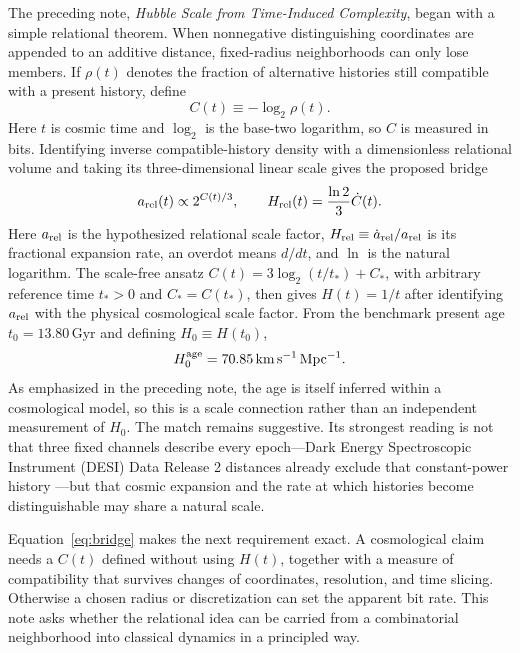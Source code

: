 \documentclass[10pt]{article}
\begin{document}
The preceding note, \emph{Hubble Scale from Time-Induced Complexity}, began
with a simple relational theorem.  When nonnegative distinguishing
coordinates are appended to an additive distance, fixed-radius neighborhoods
can only lose members.  If $\rho(t)$ denotes the fraction of alternative
histories still compatible with a present history, define
\begin{equation}
C(t)\equiv-\log_2\rho(t).
\label{eq:complexity}
\end{equation}
Here $t$ is cosmic time and $\log_2$ is the base-two logarithm, so $C$ is
measured in bits.  Identifying inverse compatible-history density with a
dimensionless relational volume and taking its three-dimensional linear scale
gives the proposed bridge
\begin{equation}
a_{\rm rel}(t)\propto2^{C(t)/3},
\qquad
H_{\rm rel}(t)=\frac{\ln2}{3}\dot C(t).
\label{eq:bridge}
\end{equation}
Here $a_{\rm rel}$ is the hypothesized relational scale factor,
$H_{\rm rel}\equiv\dot a_{\rm rel}/a_{\rm rel}$ is its fractional expansion
rate, an overdot means $d/dt$, and $\ln$ is the natural logarithm.  The
scale-free ansatz $C(t)=3\log_2(t/t_*)+C_*$, with arbitrary reference time
$t_*>0$ and $C_*=C(t_*)$, then gives $H(t)=1/t$ after identifying
$a_{\rm rel}$ with the physical cosmological scale factor.  From the benchmark
present age $t_0=13.80\,\mathrm{Gyr}$ and defining $H_0\equiv H(t_0)$,
\begin{equation}
H_0^{\rm age}=70.85\,\mathrm{km\,s^{-1}\,Mpc^{-1}}.
\label{eq:hubble-scale}
\end{equation}
As emphasized in the preceding note, the age is itself inferred within a
cosmological model, so this is a scale connection rather than an independent
measurement of $H_0$.  The match remains suggestive.  Its strongest reading
is not that three fixed channels describe every epoch---Dark Energy
Spectroscopic Instrument (DESI) Data Release 2 distances already exclude that
constant-power history \citep{DESI2025}---but that cosmic expansion and the
rate at which histories become distinguishable may share a natural scale.

Equation~\eqref{eq:bridge} makes the next requirement exact.  A cosmological
claim needs a $C(t)$ defined without using $H(t)$, together with a measure of
compatibility that survives changes of coordinates, resolution, and time
slicing.  Otherwise a chosen radius or discretization can set the apparent bit
rate.  This note asks whether the relational idea can be carried from a
combinatorial neighborhood into classical dynamics in a principled way.
\end{document}
